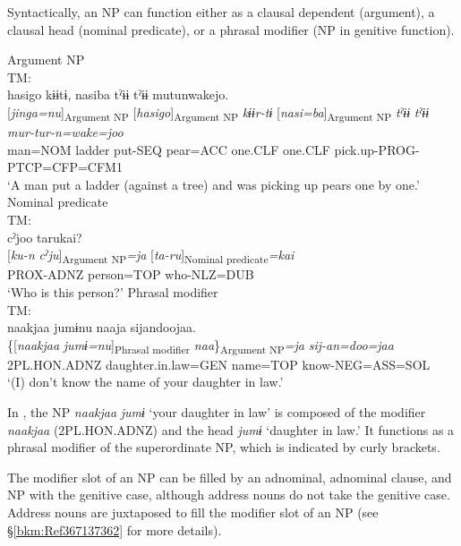 Syntactically, an NP can function either as a clausal dependent (argument), a clausal head (nominal predicate), or a phrasal modifier (NP in genitive function).

\ea\label{ex:4.2} 
\ea Argument NP\hfill\relax[PF: 090222\_00.txt]\\
   {TM:}\\
     {{{\textbar}hasigo{\textbar}}}  {{kɨɨtɨ,}}  {{nasiba}} {tˀɨɨ}  {{tˀɨɨ}}  {{mutunwakejo.}}\\
     {{[\textit{jinga=nu}]\textsubscript{Argument NP}}}  {{[\textit{hasigo}]\textsubscript{Argument NP}}}  {{\itshape kɨɨr-tɨ}}  {{[\textit{nasi=ba}]\textsubscript{Argument NP}}} {\itshape tˀɨɨ}  {{\itshape tˀɨɨ}}  {{\itshape mur-tur-n=wake=joo}}\\
     {{man=NOM}}  {{ladder}}  {{put-SEQ}}  {{pear=ACC}} {one.CLF}  {{one.CLF}}  {{pick.up-PROG-PTCP=CFP=CFM1}}\\
    \glt ‘A man put a ladder (against a tree) and was picking up pears one by one.’
\ex Nominal predicate\hfill\relax[Co: 120415\_00.txt]\\
   {TM:}\\
       {cˀjoo}  {tarukai?}\\
     {[\textit{ku-n}}  {\textit{cˀju}]\textsubscript{Argument NP}\textit{=ja}}  {[\textit{ta-ru}]\textsubscript{Nominal predicate}\textit{=kai}}\\
     {PROX-ADNZ}  {person=TOP}  {who-NLZ=DUB}\\
     \glt ‘Who is this person?’
\ex\label{ex:4.2c} Phrasal modifier\hfill\relax[Co: 110328\_00.txt]\\
   {TM:} \\
     {naakjaa}  {jumɨnu}  {naaja}  {sijandoojaa.}\\
     {\{[\textit{naakjaa}}  {\textit{jumɨ=nu}]\textsubscript{Phrasal modifier}}  {\textit{naa}\}\textsubscript{Argument NP}\textit{=ja}}  {\itshape sij-an=doo=jaa}\\
     {2PL.HON.ADNZ}  {daughter.in.law=GEN}  {name=TOP}  {know-NEG=ASS=SOL}\\
     \glt ‘(I) don’t know the name of your daughter in law.’

\z
\z
In , the NP \textit{naakjaa} \textit{jumɨ} ‘your daughter in law’ is composed of the modifier \textit{naakjaa} (2PL.HON.ADNZ) and the head \textit{jumɨ} ‘daughter in law.’ It functions as a phrasal modifier of the superordinate NP, which is indicated by curly brackets.

The modifier slot of an NP can be filled by an adnominal, adnominal clause, and NP with the genitive case, although address nouns do not take the genitive case. Address nouns are juxtaposed to fill the modifier slot of an NP (see §\ref{bkm:Ref367137362} for more details).


